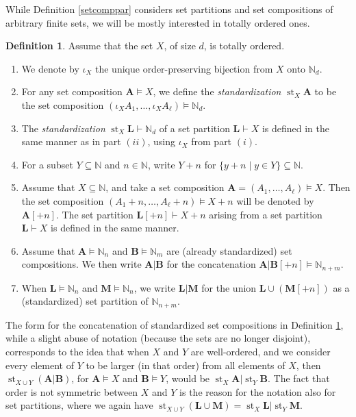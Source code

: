 \documentclass{article}
\theoremstyle{definition}
\newtheorem{defn}[thm]{Definition}
\begin{document}
While Definition \ref{setcomppar} considers set partitions and set compositions of arbitrary finite sets, we will be mostly interested in totally ordered ones.
\begin{defn}
Assume that the set $X$, of size $d$, is totally ordered.
\begin{enumerate}[$(i)$]
\item We denote by $\iota_{X}$ the unique order-preserving bijection from $X$ onto $\mathbb{N}_{d}$.
\item For any set composition $\mathbf{A} \vDash X$, we define the \emph{standardization} $\operatorname{st}_{X}\mathbf{A}$ to be the set composition $(\iota_{X}A_{1},\ldots,\iota_{X}A_{\ell})\vDash\mathbb{N}_{d}$.
\item The \emph{standardization} $\operatorname{st}_{X}\mathbf{L}\vdash\mathbb{N}_{d}$ of a set partition $\mathbf{L} \vdash X$ is defined in the same manner as in part $(ii)$, using $\iota_{X}$ from part $(i)$.
\item For a subset $Y\subseteq\mathbb{N}$ and $n\in\mathbb{N}$, write $Y+n$ for $\{y+n\;|\;y \in Y\}\subseteq\mathbb{N}$.
\item Assume that $X\subseteq\mathbb{N}$, and take a set composition $\mathbf{A}=(A_{1},\ldots,A_{\ell}) \vDash X$. Then the set composition $(A_{1}+n,\ldots,A_{\ell}+n) \vDash X+n$ will be denoted by $\mathbf{A}[+n]$. The set partition $\mathbf{L}[+n] \vdash X+n$ arising from a set partition $\mathbf{L} \vdash X$ is defined in the same manner.
\item Assume that $\mathbf{A}\vDash\mathbb{N}_{n}$ and $\mathbf{B}\vDash\mathbb{N}_{m}$ are (already standardized) set compositions. We then write $\mathbf{A}|\mathbf{B}$ for the concatenation $\mathbf{A}|\mathbf{B}[+n]\vDash\mathbb{N}_{n+m}$.
\item When $\mathbf{L}\vDash\mathbb{N}_{n}$ and $\mathbf{M}\vDash\mathbb{N}_{n}$, we write $\mathbf{L}|\mathbf{M}$ for the union $\mathbf{L}\cup(\mathbf{M}[+n])$ as a (standardized) set partition of $\mathbb{N}_{n+m}$.
\end{enumerate} \label{ordset}
\end{defn}
The form for the concatenation of standardized set compositions in Definition \ref{ordset}, while a slight abuse of notation (because the sets are no longer disjoint), corresponds to the idea that when $X$ and $Y$ are well-ordered, and we consider every element of $Y$ to be larger (in that order) from all elements of $X$, then $\operatorname{st}_{X \cup Y}(\mathbf{A}|\mathbf{B})$, for $\mathbf{A} \vDash X$ and $\mathbf{B} \vDash Y$, would be $\operatorname{st}_{X}\mathbf{A}|\operatorname{st}_{Y}\mathbf{B}$. The fact that order is not symmetric between $X$ and $Y$ is the reason for the notation also for set partitions, where we again have $\operatorname{st}_{X \cup Y}(\mathbf{L}\cup\mathbf{M})=\operatorname{st}_{X}\mathbf{L}|\operatorname{st}_{Y}\mathbf{M}$.
\end{document}
